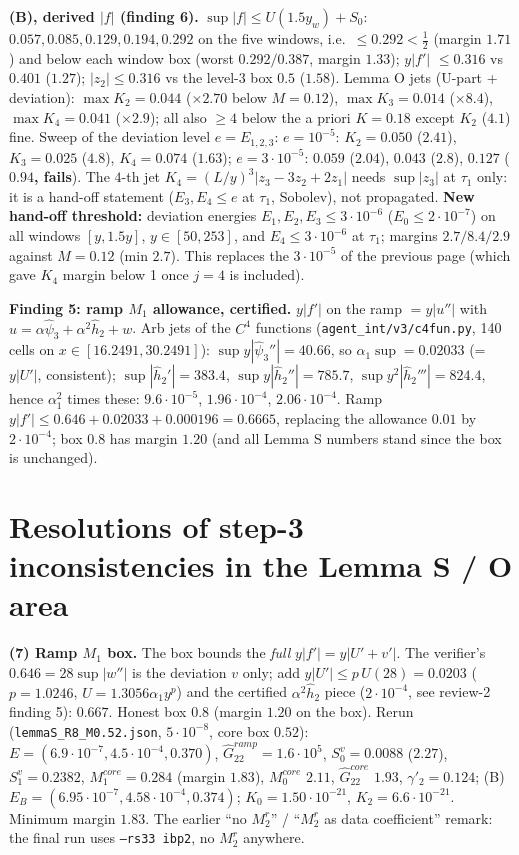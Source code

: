 \documentclass[11pt]{article}
\begin{document}
\textbf{(B), derived $|f|$ (finding 6).} $\sup|f|\le U(1.5y_w)+S_0$: $0.057,0.085,0.129,0.194,0.292$ on the five windows, i.e.\ $\le0.292<\tfrac12$ (margin $1.71$) and below each window box (worst $0.292/0.387$, margin $1.33$); $y|f'|$ $\le0.316$ vs $0.401$ ($1.27$); $|z_2|\le0.316$ vs the level-3 box $0.5$ ($1.58$). Lemma O jets (U-part + deviation): $\max K_2=0.044$ ($\times2.70$ below $M=0.12$), $\max K_3=0.014$ ($\times8.4$), $\max K_4=0.041$ ($\times2.9$); all also $\ge4$ below the a priori $K=0.18$ except $K_2$ ($4.1$) fine. Sweep of the deviation level $e=E_{1,2,3}$: $e=10^{-5}$: $K_2=0.050$ ($2.41$), $K_3=0.025$ ($4.8$), $K_4=0.074$ ($1.63$); $e=3\cdot10^{-5}$: $0.059$ ($2.04$), $0.043$ ($2.8$), $0.127$ (\textbf{$0.94$, fails}). The $4$-th jet $K_4=(L/y)^3|z_3-3z_2+2z_1|$ needs $\sup|z_3|$ at $\tau_1$ only: it is a hand-off statement ($E_3,E_4\le e$ at $\tau_1$, Sobolev), not propagated. \textbf{New hand-off threshold:} deviation energies $E_1,E_2,E_3\le3\cdot10^{-6}$ ($E_0\le2\cdot10^{-7}$) on all windows $[y,1.5y]$, $y\in[50,253]$, and $E_4\le3\cdot10^{-6}$ at $\tau_1$; margins $2.7/8.4/2.9$ against $M=0.12$ (min $2.7$). This replaces the $3\cdot10^{-5}$ of the previous page (which gave $K_4$ margin below 1 once $j=4$ is included).

\textbf{Finding 5: ramp $M_1$ allowance, certified.} $y|f'|$ on the ramp $=y|u''|$ with $u=\alpha\hat\psi_3+\alpha^2\hat h_2+w$. Arb jets of the $C^4$ functions (\texttt{agent\_int/v3/c4fun.py}, 140 cells on $x\in[16.2491,30.2491]$): $\sup y|\hat\psi_3''|=40.66$, so $\alpha_1\sup=0.02033$ (= $y|U'|$, consistent); $\sup|\hat h_2'|=383.4$, $\sup y|\hat h_2''|=785.7$, $\sup y^2|\hat h_2'''|=824.4$, hence $\alpha_1^2$ times these: $9.6\cdot10^{-5}$, $1.96\cdot10^{-4}$, $2.06\cdot10^{-4}$. Ramp $y|f'|\le0.646+0.02033+0.000196=\mathbf{0.6665}$, replacing the allowance $0.01$ by $2\cdot10^{-4}$; box $0.8$ has margin $1.20$ (and all Lemma S numbers stand since the box is unchanged).
\normalsize\newpage


\section*{Resolutions of step-3 inconsistencies in the Lemma S / O area}
\small
\textbf{(7) Ramp $M_1$ box.} The box bounds the \emph{full} $y|f'|=y|U'+v'|$. The verifier's $0.646=28\sup|w''|$ is the deviation $v$ only; add $y|U'|\le p\,U(28)=0.0203$ ($p=1.0246$, $U=1.3056\alpha_1y^p$) and the certified $\alpha^2\hat h_2$ piece ($2\cdot10^{-4}$, see review-2 finding 5): $0.667$. Honest box $\mathbf{0.8}$ (margin $1.20$ on the box). Rerun (\texttt{lemmaS\_R8\_M0.52.json}, $5\cdot10^{-8}$, core box $0.52$): $E=(6.9\cdot10^{-7},4.5\cdot10^{-4},0.370)$, $\hat G^{ramp}_{22}=1.6\cdot10^5$, $S_0^v=0.0088$ ($2.27$), $S_1^v=0.2382$, $M_1^{core}=0.284$ (margin $\mathbf{1.83}$), $M_0^{core}$ $2.11$, $\hat G^{core}_{22}$ $1.93$, $\gamma'_2=0.124$; (B) $E_B=(6.95\cdot10^{-7},4.58\cdot10^{-4},0.374)$; $K_0=1.50\cdot10^{-21}$, $K_2=6.6\cdot10^{-21}$. Minimum margin $1.83$. The earlier ``no $M_2^r$'' / ``$M_2^r$ as data coefficient'' remark: the final run uses \texttt{--rs33 ibp2}, no $M_2^r$ anywhere.
\end{document}
